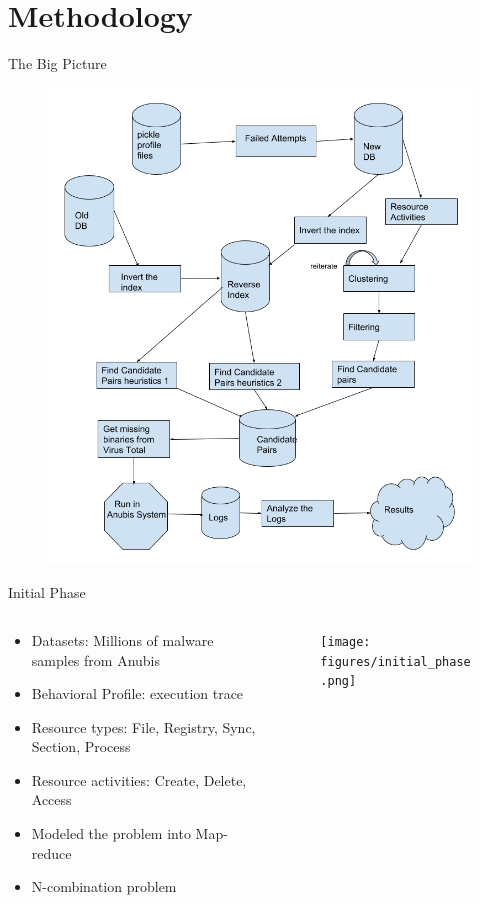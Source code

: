 \documentclass{beamer}
\begin{document}
\section{Methodology}
\label{sec:Methodology}
\begin{frame}[h]{The Big Picture}
  \begin{figure}[h]
    \centering
    \includegraphics[scale=0.25]{figures/bigpicture.png}
  \label{fig:malware_type}
  \end{figure}
\end{frame}
\begin{frame}[h]{Initial Phase}
  \begin{columns}
    \begin{column}{5cm}
      \begin{itemize}
        \item Datasets: Millions of malware samples from Anubis
        \item Behavioral Profile: execution trace
        \item Resource types: File, Registry, Sync, Section, Process
        \item Resource activities: Create, Delete, Access
        \item Modeled the problem into Map-reduce
        \item N-combination problem
      \end{itemize}
    \end{column}
    \begin{column}{5cm}
      \begin{figure}[h]
        \centering
        \texttt{[image: figures/initial\_phase.png]}
      \label{fig:malware_type}
      \end{figure}
    \end{column}
  \end{columns}
\end{frame}
\end{document}
